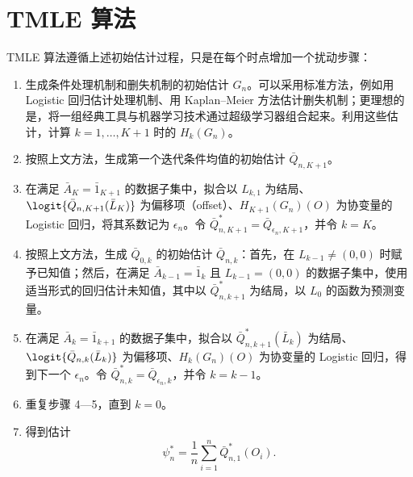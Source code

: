 \section{TMLE 算法}

TMLE 算法遵循上述初始估计过程，只是在每个时点增加一个扰动步骤：
\begin{enumerate}
 \item 生成条件处理机制和删失机制的初始估计 $G_n$。可以采用标准方法，例如用 Logistic 回归估计处理机制、用 Kaplan--Meier 方法估计删失机制；更理想的是，将一组经典工具与机器学习技术通过超级学习器组合起来。利用这些估计，计算 $k=1,\ldots,K+1$ 时的 $H_k(G_n)$。
 \item 按照上文方法，生成第一个迭代条件均值的初始估计 $\bar Q_{n,K+1}$。
 \item 在满足 $\bar A_K=\bar1_{K+1}$ 的数据子集中，拟合以 $L_{k,1}$ 为结局、$\logit\{\bar Q_{n,K+1}(\bar L_K)\}$ 为偏移项（offset）、$H_{K+1}(G_n)(O)$ 为协变量的 Logistic 回归，将其系数记为 $\epsilon_n$。令 $\bar Q_{n,K+1}^*=\bar Q_{\epsilon_n,K+1}$，并令 $k=K$。
 \item 按照上文方法，生成 $\bar Q_{0,k}$ 的初始估计 $\bar Q_{n,k}$：首先，在 $L_{k-1}\ne(0,0)$ 时赋予已知值；然后，在满足 $\bar A_{k-1}=\bar1_k$ 且 $L_{k-1}=(0,0)$ 的数据子集中，使用适当形式的回归估计未知值，其中以 $\bar Q_{n,k+1}^*$ 为结局，以 $L_0$ 的函数为预测变量。
 \item 在满足 $\bar A_k=\bar1_{k+1}$ 的数据子集中，拟合以 $\bar Q_{n,k+1}^*(\bar L_k)$ 为结局、$\logit\{\bar Q_{n,k}(\bar L_k)\}$ 为偏移项、$H_k(G_n)(O)$ 为协变量的 Logistic 回归，得到下一个 $\epsilon_n$。令 $\bar Q_{n,k}^*=\bar Q_{\epsilon_n,k}$，并令 $k=k-1$。
 \item 重复步骤 4—5，直到 $k=0$。
 \item 得到估计
 \[
  \psi_n^*=\frac1n\sum_{i=1}^n\bar Q_{n,1}^*(O_i).
 \]
\end{enumerate}
